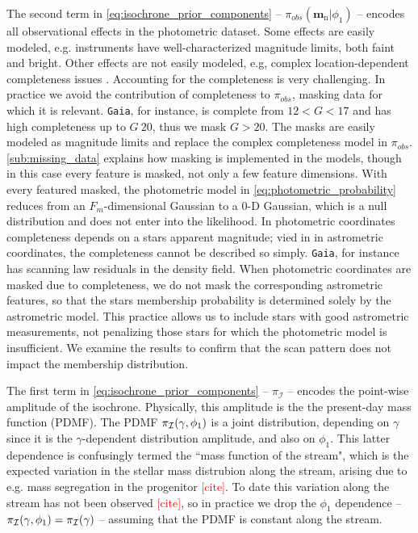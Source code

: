 \documentclass[twocolumn]{aastex631}
\newcommand{\dataarchive}[1]{\texttt{#1}}
\newcommand{\Gaia}{\dataarchive{Gaia}}
\newcommand{\mrm}[1]{\mathrm{#1}}
\newcommand{\mbs}[1]{\boldsymbol{#1}}
\newcommand{\mcal}[1]{\mathcal{#1}}
\newcommand{\prior}{\mcal{\pi}}
\newcommand{\nth}[1]{{#1}_{\mrm{n}}}  %
\newcommand{\TODO}[1]{{\textcolor{red}{#1}}}
\begin{document}
            The second term in \autoref{eq:isochrone_prior_components} -- $\prior_{obs}(\nth{\mbs{m}} | \phi_1)$ -- encodes all observational effects in the photometric dataset. Some effects are easily modeled, e.g. instruments have well-characterized magnitude limits, both faint and bright. Other effects are not easily modeled, e.g, complex location-dependent completeness issues \citep{GaiaCompleteness}.
            Accounting for the completeness is very challenging. In practice we avoid
            the contribution of completeness to $\prior_{obs}$, masking data for which it is relevant. \Gaia, for instance, is complete from $12 < G < 17$ and has high completeness up to $G ~20$, thus we mask $G > 20$.
            The masks are easily modeled as magnitude limits and replace the complex completeness model in $\prior_{obs}$.
            \autoref{sub:missing_data} explains how masking is implemented in the models, though in this case every feature is masked, not only a few feature dimensions. With every featured masked, the photometric model in \autoref{eq:photometric_probability} reduces from an $F_m$-dimensional Gaussian to a 0-D Gaussian, which is a null distribution and does not enter into the likelihood.
            In photometric coordinates completeness depends on a stars apparent magnitude; vied in in astrometric coordinates, the completeness cannot be described so simply. \Gaia, for instance has scanning law residuals in the density field. When photometric coordinates are masked due to completeness, we do not mask the corresponding  astrometric features, so that the stars  membership probability is determined solely by the astrometric model. This practice allows us to include stars with good astrometric measurements, not penalizing those stars for which the photometric model is insufficient.
            We examine the results to confirm that the scan pattern does not impact the
            membership distribution.

            The first term in \autoref{eq:isochrone_prior_components} -- $\prior_{\mcal{I}}$ -- encodes the point-wise amplitude of the isochrone.
            Physically, this amplitude is the the present-day mass function (PDMF). The PDMF $\prior_{\cal{I}}(\gamma, \phi_1)$ is a joint distribution, depending on $\gamma$ since it is the $\gamma$-dependent distribution amplitude, and also on $\phi_1$. This latter dependence is confusingly termed the ``mass function of the stream", which is the expected variation in the stellar mass distrubion along the stream, arising due to e.g. mass segregation in the progenitor \TODO{[cite]}. To date this variation along the stream has not been observed \TODO{[cite]}, so in practice we drop the $\phi_1$ dependence -- $\prior_{\cal{I}}(\gamma, \phi_1) = \prior_{\cal{I}}(\gamma)$ -- assuming that the PDMF is constant along the stream.
\end{document}
